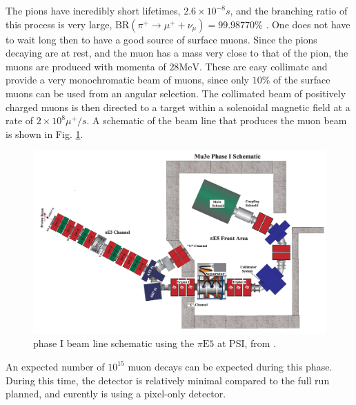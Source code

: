 \noindent The pions have incredibly short lifetimes, $2.6 \times 10^{-8}s$, and the branching ratio of this process is very large, $\textrm{BR}(\pi^+ \rightarrow \mu^+ + \nu_\mu) = 99.98770\%$ \cite{Agashe:2014kda}.
One does not have to wait long then to have a good source of surface muons.
Since the pions decaying are at rest, and the muon has a mass very close to that of the pion, the muons are produced with momenta of $28\textrm{MeV}$.
These are easy collimate and provide a very monochromatic beam of muons, since only $10\%$ of the surface muons can be used from an angular selection.
The collimated beam of positively charged muons is then directed to a target within a solenoidal magnetic field at a rate of $2 \times 10^8 \mu^+/s$.
A schematic of the beam line that produces the muon beam is shown in Fig. \ref{fig:mueee_phaseI_schematic}.

\begin{figure}[h]
    \centering
    \includegraphics[width = \textwidth]{Figures/experiments/mu3e_phase1_schematic.png}
    \caption{\mueee phase I beam line schematic using the $\pi\textrm{E5}$ at PSI, from \cite{Blondel:2013ia}.}
    \label{fig:mueee_phaseI_schematic}
\end{figure}

An expected number of $10^{15}$ muon decays can be expected during this phase.
During this time, the detector is relatively minimal compared to the full run planned, and curently is using a pixel-only detector.
